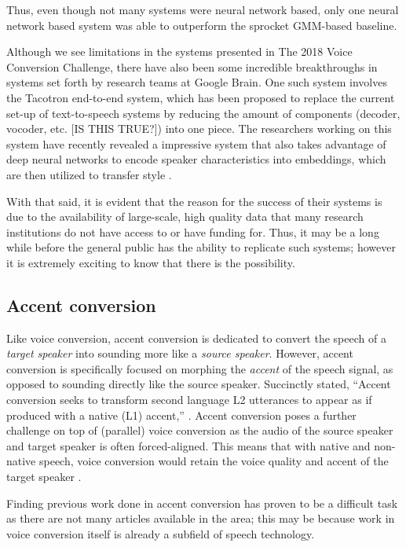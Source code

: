 \documentclass
[
    a4paper,
    twoside,
    12pt
]
{report}
\begin{document}
Thus, even though not many systems were neural network based, only one
neural network based system was able to outperform the sprocket
GMM-based baseline.

Although we see limitations in the systems presented in The 2018 Voice
Conversion Challenge, there have also been some incredible breakthroughs
in systems set forth by research teams at Google Brain. One such system
involves the Tacotron end-to-end system, which has been proposed to
replace the current set-up of text-to-speech systems by reducing the
amount of components (decoder, vocoder, etc. {[}IS THIS TRUE?{]}) into
one piece. The researchers working on this system have recently revealed
a impressive system that also takes advantage of deep neural networks to
encode speaker characteristics into embeddings, which are then utilized
to transfer style \parencite{wang2018}.

With that said, it is evident that the reason for the success of their
systems is due to the availability of large-scale, high quality data
that many research institutions do not have access to or have funding
for. Thus, it may be a long while before the general public has the
ability to replicate such systems; however it is extremely exciting to
know that there is the possibility.

\subsection{Accent conversion}\label{accent-conversion}

Like voice conversion, accent conversion is dedicated to convert the
speech of a \emph{target speaker} into sounding more like a \emph{source
speaker}. However, accent conversion is specifically focused on morphing
the \emph{accent} of the speech signal, as opposed to sounding directly
like the source speaker. Succinctly stated, ``Accent conversion seeks to
transform second language L2 utterances to appear as if produced with a
native (L1) accent,'' \parencite{aryal2014a}. Accent conversion poses a
further challenge on top of (parallel) voice conversion as the audio of
the source speaker and target speaker is often forced-aligned. This
means that with native and non-native speech, voice conversion would
retain the voice quality and accent of the target speaker
\parencite{aryal2014}.

Finding previous work done in accent conversion has proven to be a
difficult task as there are not many articles available in the area;
this may be because work in voice conversion itself is already a
subfield of speech technology.
\end{document}
